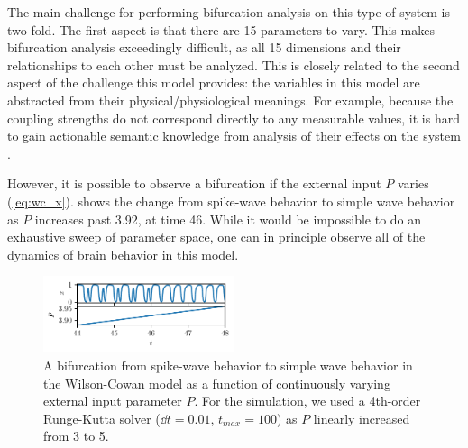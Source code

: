The main challenge for performing bifurcation analysis on this type of system is two-fold.
The first aspect is that there are 15 parameters to vary.
This makes bifurcation analysis exceedingly difficult, as all 15 dimensions and their relationships to each other must be analyzed.
This is closely related to the second aspect of the challenge this model provides: the variables in this model are abstracted from their physical/physiological meanings.
For example, because the coupling strengths do not correspond directly to any measurable values, it is hard to gain actionable semantic knowledge from analysis of their effects on the system \cite{Jirsa2014}.

However, it is possible to observe a bifurcation if the external input $P$ varies (\cref{eq:wc_x}).
 shows the change from spike-wave behavior to simple wave behavior as $P$ increases past 3.92, at time 46.
While it would be impossible to do an exhaustive sweep of parameter space, one can in principle observe all of the dynamics of brain behavior in this model.
\begin{figure}[ht]
  \centering
  \includegraphics[width=0.5\textwidth]{figure/wc_bifurcation.pdf}
  \caption[Wilson-Cowan bifurcation]{A bifurcation from spike-wave behavior to simple wave behavior in the Wilson-Cowan model as a function of continuously varying external input parameter $P$.
    For the simulation, we used a 4th-order Runge-Kutta solver ($\dd{t} = 0.01$, $t_{max} = 100$) as $P$ linearly increased from 3 to 5.
  }
  \label{fig:wc_bifurcation}
\end{figure}

